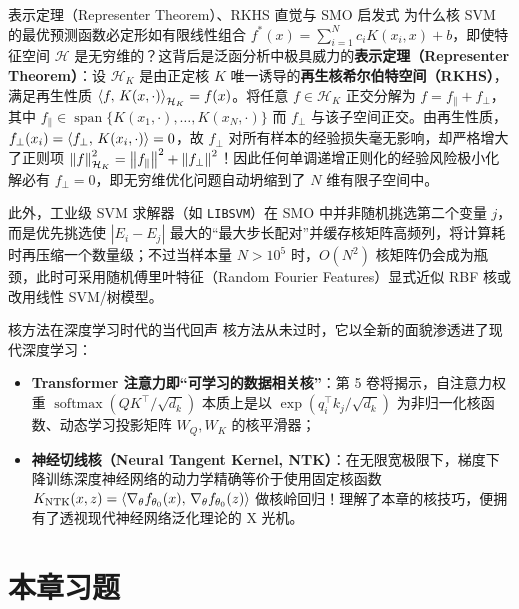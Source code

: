 \begin{extBox}{表示定理（Representer Theorem）、RKHS 直觉与 SMO 启发式}
为什么核 SVM 的最优预测函数必定形如有限线性组合 $f^*(x) = \sum_{i=1}^N c_i K(x_i, x) + b$，即使特征空间 $\mathcal{H}$ 是无穷维的？这背后是泛函分析中极具威力的\textbf{表示定理（Representer Theorem）}：设 $\mathcal{H}_K$ 是由正定核 $K$ 唯一诱导的\textbf{再生核希尔伯特空间（RKHS）}，满足再生性质 $\left\langle f,\, K(x, \cdot) \right\rangle_{\mathcal{H}_K} = f(x)$。将任意 $f \in \mathcal{H}_K$ 正交分解为 $f = f_\parallel + f_\perp$，其中 $f_\parallel \in \operatorname{span}\{K(x_1,\cdot), \dots, K(x_N,\cdot)\}$ 而 $f_\perp$ 与该子空间正交。由再生性质，$f_\perp(x_i) = \left\langle f_\perp,\, K(x_i,\cdot) \right\rangle = 0$，故 $f_\perp$ 对所有样本的经验损失毫无影响，却严格增大了正则项 $\left\|f\right\|_{\mathcal{H}_K}^2 = \left\|f_\parallel\right\|^2 + \left\|f_\perp\right\|^2$！因此任何单调递增正则化的经验风险极小化解必有 $f_\perp = 0$，即无穷维优化问题自动坍缩到了 $N$ 维有限子空间中。

此外，工业级 SVM 求解器（如 \texttt{LIBSVM}）在 SMO 中并非随机挑选第二个变量 $j$，而是优先挑选使 $|E_i - E_j|$ 最大的“最大步长配对”并缓存核矩阵高频列，将计算耗时再压缩一个数量级；不过当样本量 $N > 10^5$ 时，$O(N^2)$ 核矩阵仍会成为瓶颈，此时可采用随机傅里叶特征（Random Fourier Features）显式近似 RBF 核或改用线性 SVM/树模型。
\end{extBox}

\begin{insightBox}{核方法在深度学习时代的当代回声}
核方法从未过时，它以全新的面貌渗透进了现代深度学习：
\begin{itemize}
  \item \textbf{Transformer 注意力即“可学习的数据相关核”}：第 5 卷将揭示，自注意力权重 $\operatorname{softmax}(QK^\top / \sqrt{d_k})$ 本质上是以 $\exp(q_i^\top k_j / \sqrt{d_k})$ 为非归一化核函数、动态学习投影矩阵 $W_Q, W_K$ 的核平滑器；
  \item \textbf{神经切线核（Neural Tangent Kernel, NTK）}：在无限宽极限下，梯度下降训练深度神经网络的动力学精确等价于使用固定核函数 $K_{\mathrm{NTK}}(x, z) = \left\langle \nabla_\theta f_{\theta_0}(x),\, \nabla_\theta f_{\theta_0}(z) \right\rangle$ 做核岭回归！理解了本章的核技巧，便拥有了透视现代神经网络泛化理论的 X 光机。
\end{itemize}
\end{insightBox}

\section{本章习题}\label{sec:ch4-ex}

